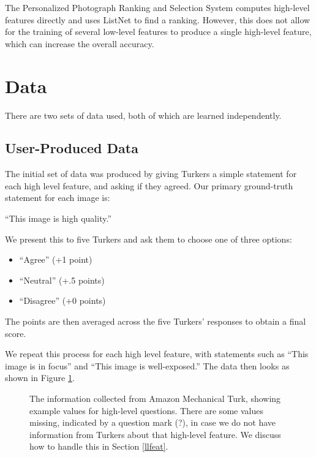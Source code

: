 \documentclass[11pt,letter]{article}
\begin{document}
The Personalized Photograph Ranking and Selection System\cite{Yeh:2010:PPR:1873951.1873963} computes high-level features directly and uses ListNet\cite{Cao:2007:LRP:1273496.1273513} to find a ranking. However, this does not allow for the training of several low-level features to produce a single high-level feature, which can increase the overall accuracy.

\section{Data}

There are two sets of data used, both of which are learned independently.

\subsection{User-Produced Data}
\label{turkdata}
The initial set of data was produced by giving Turkers a simple statement for each high level feature, and asking if they agreed. Our primary ground-truth statement for each image is:

``This image is high quality.''

We present this to five Turkers and ask them to choose one of three options:

\begin{itemize}
\item ``Agree'' (+1 point)
\item ``Neutral'' (+.5 points)
\item ``Disagree'' (+0 points)
\end{itemize}
The points are then averaged across the five Turkers' responses to obtain a final score.

We repeat this process for each high level feature, with statements such as ``This image is in focus'' and ``This image is well-exposed.'' The data then looks as shown in Figure \ref{fig:turktable}.

\begin{figure}
\centering
{}
\caption{The information collected from Amazon Mechanical Turk, showing example values for high-level questions. There are some values missing, indicated by a question mark (?), in case we do not have information from Turkers about that high-level feature. We discuss how to handle this in Section \ref{llfeat}.}
\label{fig:turktable}
\end{figure}
\end{document}
